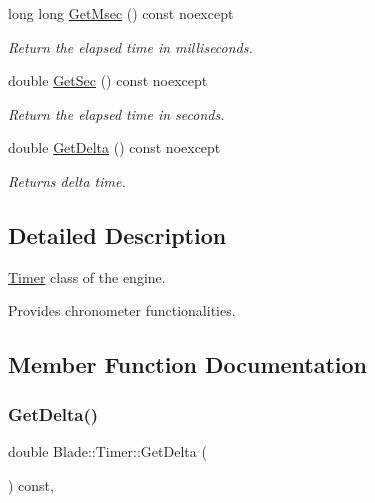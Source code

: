 \begin{DoxyCompactItemize}
long long \hyperlink{class_blade_1_1_timer_a83e1a3a261b33dff4e361c5eb8a7f4d8}{Get\+Msec} () const noexcept
\begin{DoxyCompactList}\small\item\em Return the elapsed time in milliseconds. \end{DoxyCompactList}\item 
double \hyperlink{class_blade_1_1_timer_abd1d2fce63f777d7c5a8557b87533cbd}{Get\+Sec} () const noexcept
\begin{DoxyCompactList}\small\item\em Return the elapsed time in seconds. \end{DoxyCompactList}\item 
double \hyperlink{class_blade_1_1_timer_af099ed32b18b31459e4597df10ad2c7f}{Get\+Delta} () const noexcept
\begin{DoxyCompactList}\small\item\em Returns delta time. \end{DoxyCompactList}\end{DoxyCompactItemize}


\subsection{Detailed Description}
\hyperlink{class_blade_1_1_timer}{Timer} class of the engine. 

Provides chronometer functionalities. 

\subsection{Member Function Documentation}
\mbox{\label{class_blade_1_1_timer_af099ed32b18b31459e4597df10ad2c7f}} 
\subsubsection{\texorpdfstring{Get\+Delta()}{GetDelta()}}
{\footnotesize\ttfamily double Blade\+::\+Timer\+::\+Get\+Delta (\begin{DoxyParamCaption}{ }\end{DoxyParamCaption}) const\hspace{0.3cm}{\ttfamily [inline]}, {\ttfamily [noexcept]}}




